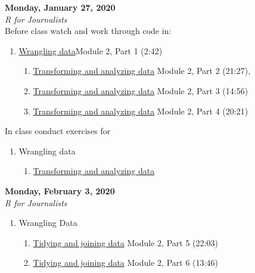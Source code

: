 \documentclass{article}
\begin{document}
\bigskip
\textbf{Monday, January 27, 2020\\}
\emph{R for Journalists}\\
Before class watch and work through code in: 
\begin{enumerate}
\item \href{http://learn.r-journalism.com/en/wrangling/}{Wrangling data}Module 2, Part 1 (2:42)
\begin{enumerate}
\item \href{http://learn.r-journalism.com/en/wrangling/dplyr/dplyr/}{Transforming and analyzing data} Module 2, Part 2 (21:27), 
\item \href{http://learn.r-journalism.com/en/wrangling/dplyr/dplyr/}{Transforming and analyzing data} Module 2, Part 3 (14:56)
\item \href{http://learn.r-journalism.com/en/wrangling/dplyr/dplyr/}{Transforming and analyzing data} Module 2, Part 4 (20:21)
\end{enumerate}
\end{enumerate}
\bigskip
In class conduct exercises for
\begin{enumerate}
\item Wrangling data
\begin{enumerate}
\item \href{http://code.r-journalism.com/chapter-3/#section-transforming-and-analyzing-data}{Transforming and analyzing data}

\end{enumerate}

\end{enumerate}
\bigskip
\textbf{Monday, February 3, 2020\\}
\emph{R for Journalists}\\

\begin{enumerate}
\item Wrangling Data
\begin{enumerate}
\item \href{http://learn.r-journalism.com/en/wrangling/tidyr_joins/tidyr-joins/}{Tidying and joining data} Module 2, Part 5 (22:03)
\item \href{http://learn.r-journalism.com/en/wrangling/tidyr_joins/tidyr-joins/}{Tidying and joining data} Module 2, Part 6 (13:46)
\end{enumerate}

\end{enumerate}
\end{document}
